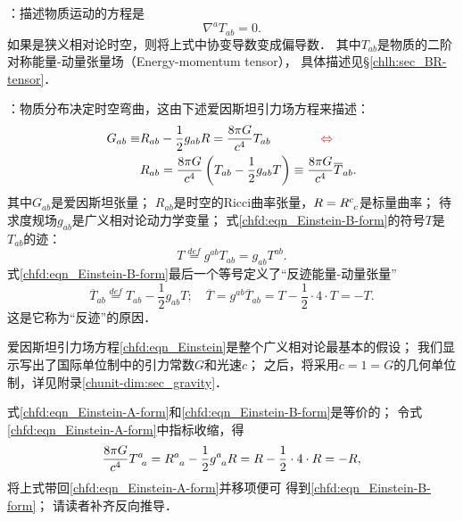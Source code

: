 \noindent{}：描述物质运动的方程是
\begin{equation}\label{chfd:eqn_motion-gr}
    \nabla^a T_{ab} =0.
\end{equation}
如果是狭义相对论时空，则将上式中协变导数变成偏导数．
其中$T_{ab}$是物质的二阶对称能量-动量张量场（Energy-momentum tensor），
具体描述见\S\ref{chlh:sec_BR-tensor}．



\noindent{}：物质分布决定时空弯曲，这由下述爱因斯坦引力场方程来描述：
\begin{subequations}\label{chfd:eqn_Einstein}
	\begin{align}
		G_{ab} \equiv & R_{ab} - \frac{1}{2}g_{ab} R = \frac{8\pi G}{c^4} T_{ab}
		\label{chfd:eqn_Einstein-A-form} {\qquad \qquad \color{red} \Leftrightarrow} \\
		& R_{ab} = \frac{8\pi G}{c^4} \left(T_{ab} - \frac{1}{2}g_{ab}T \right)
        \equiv \frac{8\pi G}{c^4} \overline{T}_{ab}. \label{chfd:eqn_Einstein-B-form}
	\end{align}
\end{subequations}
其中$G_{ab}$是爱因斯坦张量；
$R_{ab}$是时空的Ricci曲率张量，$R=R^c_{\hphantom{c} c}$是标量曲率；
待求度规场$g_{ab}$是广义相对论动力学变量；
式\eqref{chfd:eqn_Einstein-B-form}的符号$T$是${T}_{ab}$的迹：
\begin{equation}
    T \overset{def}{=} g^{ab}T_{ab} = g_{ab}T^{ab} .
\end{equation}
式\eqref{chfd:eqn_Einstein-B-form}最后一个等号定义了“反迹能量-动量张量”
\begin{equation}
    \overline{T}_{ab}\overset{def}{=}T_{ab} - \frac{1}{2}g_{ab}T ;\quad
    \overline{T} = g^{ab}\overline{T}_{ab} %
      = T-\frac{1}{2}\cdot 4\cdot T = -T .
\end{equation}
这是它称为“反迹”的原因．

爱因斯坦引力场方程\eqref{chfd:eqn_Einstein}是整个广义相对论最基本的假设；
我们显示写出了国际单位制中的引力常数$G$和光速$c$；
之后，将采用$c=1= G$的几何单位制，详见附录\ref{chunit-dim:sec_gravity}．

式\eqref{chfd:eqn_Einstein-A-form}和\eqref{chfd:eqn_Einstein-B-form}是等价的；
令式\eqref{chfd:eqn_Einstein-A-form}中指标收缩，得
\begin{equation}\label{chfd:eqn_R-and-T}
	\frac{8\pi G}{c^4} T^{a}_{\hphantom{a} a} 
    = R^{a}_{\hphantom{a} a} -  \frac{1}{2}g^{a}_{\hphantom{a} a} R
	=R - \frac{1}{2}\cdot 4 \cdot R =-R,
\end{equation}
将上式带回\eqref{chfd:eqn_Einstein-A-form}并移项便可
得到\eqref{chfd:eqn_Einstein-B-form}；
请读者补齐反向推导．

